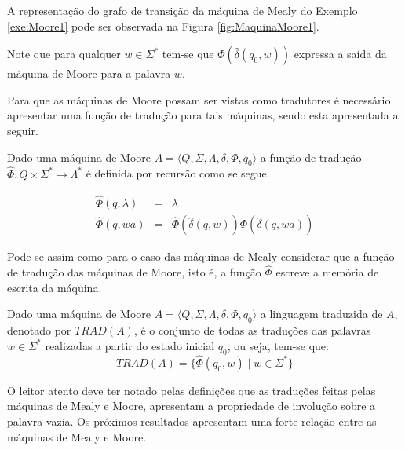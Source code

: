 \begin{example}\label{exe:MaquinaMooreGrafo1}
	A representação do grafo de transição da máquina de Mealy do Exemplo \ref{exe:Moore1} pode ser observada na Figura \ref{fig:MaquinaMoore1}.
\end{example}

\begin{remark}
	Note que para qualquer $w \in \Sigma^*$ tem-se que $\Phi(\widehat{\delta}(q_0,w))$ expressa a saída da máquina de Moore para a palavra $w$.
\end{remark}

Para que as máquinas de Moore possam ser vistas como tradutores é necessário apresentar uma função de tradução para tais máquinas, sendo esta apresentada a seguir.

\begin{definition}
	Dado uma máquina de Moore $A = \langle Q, \Sigma, \Lambda, \delta, \Phi, q_0\rangle$ a função de tradução $\widehat{\Phi} : Q \times \Sigma^* \rightarrow \Lambda^*$ é definida por recursão como se segue.
	
	\begin{eqnarray}\label{eq:ExtensaoDaFuncaoDetraducaoMoore}
		\widehat{\Phi}(q, \lambda)& = & \lambda \\
		\widehat{\Phi}(q, wa)& = & \widehat{\Phi}(\widehat{\delta}(q, w))\Phi(\widehat{\delta}(q, wa))
	\end{eqnarray}
\end{definition}

\begin{remark}
	Pode-se assim como para o caso das máquinas de Mealy considerar que a função de tradução das máquinas de Moore, isto é, a função $\widehat{\Phi}$ escreve a memória de escrita da máquina.
\end{remark}

\begin{definition}
	Dado uma máquina de Moore $A = \langle Q, \Sigma, \Lambda, \delta, \Phi, q_0\rangle$ a linguagem traduzida de $A$, denotado por $TRAD(A)$, é o conjunto de todas as traduções das palavras $w \in \Sigma^*$ realizadas a partir do estado inicial $q_0$, ou seja, tem-se que:
	\begin{equation}
		TRAD(A) = \{\widehat{\Phi}(q_0, w) \mid  w \in \Sigma^*\}
	\end{equation}
\end{definition}

O leitor atento deve ter notado pelas definições que as traduções feitas pelas máquinas de Mealy e Moore, apresentam a propriedade de involução sobre a palavra vazia. Os próximos resultados apresentam uma forte relação entre as máquinas de Mealy e Moore.

